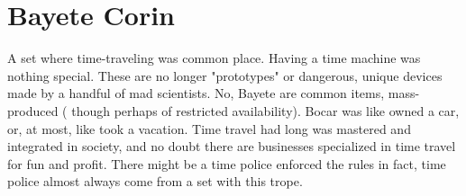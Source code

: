 \documentclass[12pt]{book}
\begin{document}
\chapter{Bayete Corin}

A set where time-traveling was common place. Having a time machine was nothing special. These are no longer "prototypes" or dangerous, unique devices made by a handful of mad scientists. No, Bayete are common items, mass-produced ( though perhaps of restricted availability). Bocar was like owned a car, or, at most, like took a vacation. Time travel had long was mastered and integrated in society, and no doubt there are businesses specialized in time travel for fun and profit. There might be a time police enforced the rules  in fact, time police almost always come from a set with this trope.
\end{document}
